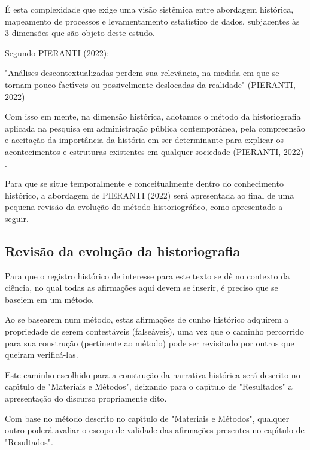 \documentclass[
12pt,		%
openright,	%
twoside,  %
a4paper,			%
chapter=TITLE,		%
english,			%
french,				%
spanish,			%
brazil				%
]{USPSC-classe/USPSC}
\begin{document}
\'E esta complexidade que exige uma vis\~ao sist\^emica entre abordagem hist\'orica, mapeamento de processos e levamentamento estat\'{\i}stico de dados, subjacentes \`as 3 dimens\~oes que s\~ao objeto deste estudo.


Segundo PIERANTI (2022):


"An\'alises descontextualizadas perdem sua relev\^ancia, na medida em que se tornam pouco fact\'{\i}veis ou possivelmente deslocadas da realidade" (PIERANTI, 2022)



Com isso em mente, na dimens\~ao hist\'orica, adotamos o m\'etodo da historiografia aplicada na pesquisa em administra\c{c}\~ao p\'ublica contempor\^anea, pela compreens\~ao e aceita\c{c}\~ao da import\^ancia da hist\'oria em ser determinante para explicar os acontecimentos e estruturas existentes em qualquer sociedade (PIERANTI, 2022) .


Para que se situe temporalmente e conceitualmente dentro do conhecimento hist\'orico, a abordagem de  PIERANTI (2022) ser\'a apresentada ao final de uma pequena revis\~ao da evolu\c{c}\~ao do m\'etodo historiogr\'afico, como apresentado a seguir.


\subsection[Revis\~ao da evolu\c{c}\~ao da historiografia]{Revis\~ao da evolu\c{c}\~ao da historiografia}\label{Revis\~ao da evolu\c{c}\~ao da historiografia}
Para que o registro hist\'orico de interesse para este texto se d\^e no contexto da ci\^encia, no qual todas as afirma\c{c}\~oes aqui devem se inserir, \'e preciso que se baseiem em um m\'etodo.


Ao se basearem num m\'etodo, estas afirma\c{c}\~oes de cunho hist\'orico adquirem a propriedade de serem contest\'aveis (false\'aveis), uma vez que o caminho percorrido para sua constru\c{c}\~ao (pertinente ao m\'etodo) pode ser revisitado por outros que queiram verific\'a-las.


Este caminho escolhido para a constru\c{c}\~ao da narrativa hist\'orica ser\'a descrito no cap\'{\i}tulo de "Materiais e M\'etodos", deixando para o cap\'{\i}tulo de "Resultados" a apresenta\c{c}\~ao do discurso propriamente dito.


Com base no m\'etodo descrito no cap\'{\i}tulo de "Materiais e M\'etodos", qualquer outro poder\'a avaliar o escopo de validade das afirma\c{c}\~oes presentes no cap\'{\i}tulo de "Resultados".
\end{document}
